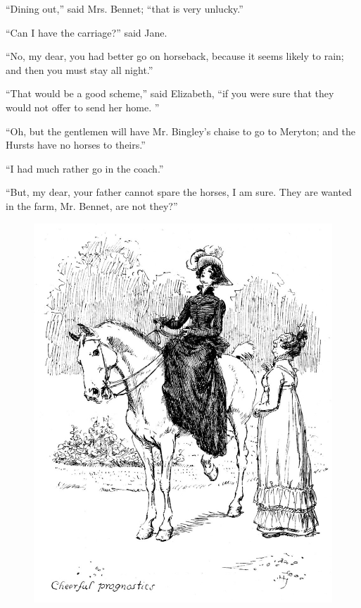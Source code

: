 \documentclass[10pt]{book}
\begin{document}
   “Dining out,” said Mrs. Bennet; “that is very unlucky.”
  

   “Can I have the carriage?” said Jane.
  

   “No, my dear, you had better go on horseback, because it seems likely to
rain; and then you must stay all night.”
  

   “That would be a good scheme,” said Elizabeth, “if you were sure that
they would not offer to send her home.
   ”
  

   “Oh, but the gentlemen will have Mr. Bingley’s chaise to go to Meryton;
and the Hursts have no horses to theirs.”
  

   “I had much rather go in the coach.”
  

   “But, my dear, your father cannot spare the horses, I am sure. They are
wanted in the farm, Mr. Bennet, are not they?”
  

\begin{figure}[h]
\centering
\includegraphics[width=\linewidth]{images/i_069.jpg}
\end{figure}
\end{document}
